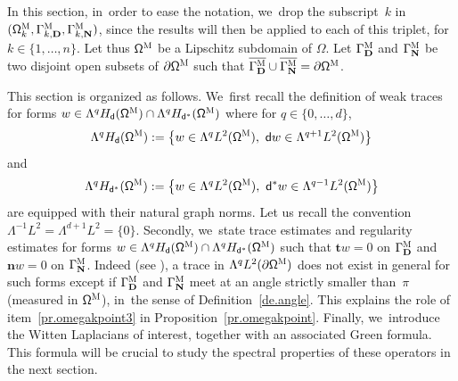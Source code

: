 \documentclass[10pt]{amsart}
\newcommand{\mbf}[1]{\mathbf{#1}}
\let\pa\partial
\theoremstyle{plain}
\theoremstyle{definition}
\begin{document}
In this section, in~order to ease the notation, we~drop the subscript~$k$ in
$(\mathsf \Omega^{\textsc{M}}_{k}, \Gamma^{\textsc{M}}_{k,\mbf D},
\Gamma^{\textsc{M}}_{k,\mbf N})$, since the results will then be applied to each of
this triplet, for $k \in \{1, \ldots,n\}$.
Let thus $\mathsf \Omega^{\textsc{M}}$ be a Lipschitz subdomain of
$\Omega$. Let $\Gamma^{\textsc{M}}_{\mbf D}$ and
$\Gamma^{\textsc{M}}_{\mbf N}$ be two disjoint open subsets of
$\partial \mathsf \Omega^{\textsc{M}}$ such that
$\overline{\Gamma^{\textsc{M}}_{\mbf D}} \cup
\overline{\Gamma^{\textsc{M}}_{\mbf N}} = \pa \mathsf
\Omega^{\textsc{M}}$.

This section is organized as follows. We~first recall the definition
of weak traces for forms $w\in \Lambda^q H_{\mathsf d} (\mathsf
\Omega^{\textsc{M}})\cap \Lambda^q H_{\mathsf d^*} (\mathsf
\Omega^{\textsc{M}})$
where for $q\in\{0,\ldots,d\}$,
\begin{equation}
\label{eq.H-d}
\Lambda^q H_{\mathsf d} (\mathsf \Omega^{\textsc{M}}):= \left\{w\in \Lambda^q L^2 (\mathsf \Omega^{\textsc{M}}),\ \mathsf dw\in\Lambda^{q+1} L^2 (\mathsf \Omega^{\textsc{M}})\right\}
\end{equation}
and
\begin{equation}
\label{eq.H-d*}
\Lambda^q H_{\mathsf d^*} (\mathsf \Omega^{\textsc{M}}):=\left\{w\in \Lambda^q L^2 (\mathsf \Omega^{\textsc{M}}),\ \mathsf d^*w\in\Lambda^{q-1} L^2 (\mathsf \Omega^{\textsc{M}})\right\}
\end{equation}
are equipped with their natural graph norms. Let us recall the
convention $ \Lambda^{-1} L^2=\Lambda^{d+1} L^2=\{0\}$.
Secondly, we~state trace estimates and regularity estimates for forms $w\in \Lambda^q H_{\mathsf d} (\mathsf \Omega^{\textsc{M}})\cap \Lambda^q H_{\mathsf d^*} (\mathsf \Omega^{\textsc{M}})$ such that $\mbf t w=0$ on $\Gamma^{\textsc{M}}_{\mbf D}$ and $\mbf n w=0$ on $\Gamma^{\textsc{M}}_{\mbf N}$.
Indeed (see \cite{brown-94,jakab-mitrea-mitrea-09}), a trace in $\Lambda^q L^2(\partial \mathsf
\Omega^{\textsc{M}})$ does not exist in general for such forms except if $\Gamma^{\textsc{M}}_{\mbf D}$ and $\Gamma^{\textsc{M}}_{\mbf N}$ meet at an angle strictly
smaller than~$\pi$ (measured in $\mathsf \Omega^{\textsc{M}}$), in~the
sense of
Definition~\ref{de.angle}. This explains the role of item~\eqref{pr.omegakpoint3} in
Proposition~\ref{pr.omegakpoint}. Finally, we~introduce the Witten
Laplacians of interest, together with an associated Green
formula. This formula will be crucial to study the spectral
properties of these operators in the next section.
\end{document}
